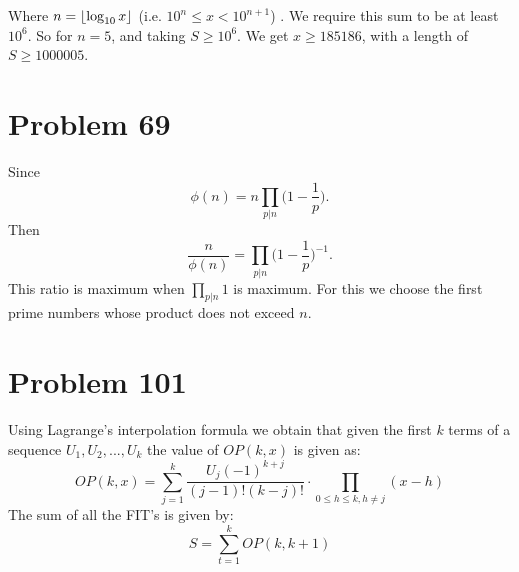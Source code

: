 \documentclass[12pt]{article}
\DeclarePairedDelimiter\floor{\lfloor}{\rfloor}
\begin{document}
Where $n=\floor*{\log_{10} x}$ (i.e. $10^n \leq x < 10^{n+1}$) .
We require this sum to be at least $10^6$. So for $n = 5$, and taking $S \geq 10^6$.
We get $x \geq 185186$, with a length of $S \geq 1000005$.
\section*{Problem 69}
Since
$$\phi(n) = n \prod_{p | n} \bigg( 1- \frac{1}{p} \bigg).$$
Then
$$\frac{n}{\phi(n)} =\prod_{p | n} \bigg( 1- \frac{1}{p} \bigg)^{-1}. $$
This ratio is maximum when $\prod_{p|n} 1$ is maximum. For this we choose the first prime numbers whose product does not exceed $n$.
\section*{Problem 101}
Using Lagrange's interpolation formula we obtain that given the first $k$ terms of a sequence $U_1,U_2,...,U_k$
the value of $OP(k,x)$ is given as:
$$ OP(k,x) = \sum_{j=1}^k \frac{U_j(-1)^{k+j}}{(j-1)!(k-j)!} \cdot \prod_{0 \leq h \leq k, h \neq j}(x-h)$$
The sum of all the FIT's is given by:
$$ S = \sum_{t=1}^k OP(k,k+1)$$
\end{document}
